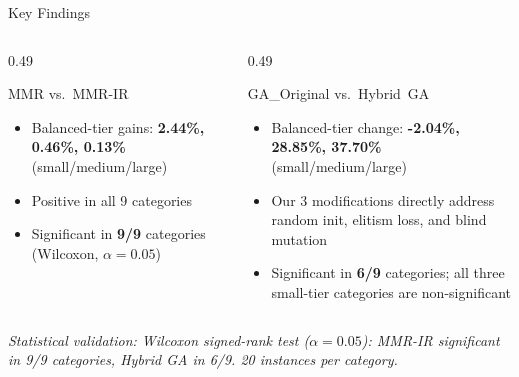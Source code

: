 \documentclass[aspectratio=169,10pt]{beamer}
\begin{document}
\begin{frame}{Key Findings}


  \vspace{0.25cm}
  \begin{columns}[T]
    \begin{column}{0.49\textwidth}
      \begin{block}{MMR vs.\ MMR-IR}
        {\small
        \begin{itemize}\itemsep3pt
          \item Balanced-tier gains: \textbf{2.44\%, 0.46\%, 0.13\%}
            (small/medium/large)
          \item Positive in all 9 categories
          \item Significant in \textbf{9/9} categories (Wilcoxon, $\alpha=0.05$)
        \end{itemize}
        }
      \end{block}
    \end{column}
    \begin{column}{0.49\textwidth}
      \begin{block}{GA\_Original vs.\ Hybrid~GA}
        {\small
        \begin{itemize}\itemsep3pt
          \item Balanced-tier change: \textbf{-2.04\%, 28.85\%, 37.70\%}
            (small/medium/large)
          \item Our 3 modifications directly address
            random init, elitism loss, and blind mutation
          \item Significant in \textbf{6/9} categories; all three small-tier
            categories are non-significant
        \end{itemize}
        }
      \end{block}
    \end{column}
  \end{columns}

  \vspace{0.2cm}
  \colorbox{navymidHex}{\begin{minipage}{\linewidth}
    \vspace{5pt}
    {\color{teallt}\small\itshape\centering
     Statistical validation: Wilcoxon signed-rank test ($\alpha = 0.05$):
     MMR-IR significant in 9/9 categories, Hybrid GA in 6/9. 20 instances per category.\par}
    \vspace{5pt}
  \end{minipage}}

\end{frame}
\end{document}
